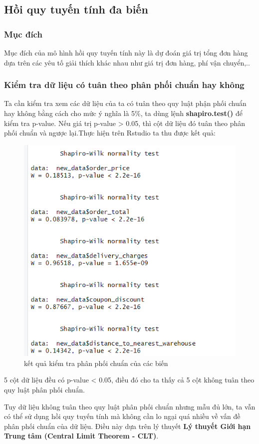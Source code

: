 \subsection{Hồi quy tuyến tính đa biến}
\subsubsection{Mục đích}

Mục đích của mô hình hồi quy tuyến tính này là dự đoán giá trị tổng đơn hàng dựa trên các yêu tố giải thích khác nhau như giá trị đơn hàng, phí vận chuyển,..

\subsubsection{Kiểm tra dữ liệu có tuân theo phân phối chuẩn hay không} 

Ta cần kiểm tra xem các dữ liệu của ta có tuân theo quy luật phận phối chuẩn hay không bằng cách cho mức ý nghĩa là 5\%, ta dùng lệnh \textbf{shapiro.test()} để kiểm tra p-value. Nếu giá trị p-value > 0.05, thì cột dữ liệu đó tuân theo phân phối chuẩn và ngược lại.Thực hiện trên Rstudio ta thu được kết quả:


\begin{figure}[ht]
  \centering
  \includegraphics[width=0.7\linewidth]{graphics/5.5.0.png}
  \caption{kết quả kiểm  tra phân phối chuẩn của các biến }
\end{figure}

5 cột dữ liệu đều có p-value < 0.05, điều đó cho ta thấy cả 5 cột không tuân theo quy luật phân phối chuẩn.

Tuy dữ liệu không tuân theo quy luật phân phối chuẩn nhưng mẫu đủ lớn, ta vẫn có thể sử dụng hồi quy tuyến tính mà không cần lo ngại quá nhiều về vấn đề phân phối chuẩn của dữ liệu. Điều này dựa trên lý thuyết \textbf{Lý thuyết Giới hạn Trung tâm (Central Limit Theorem - CLT)}. 

